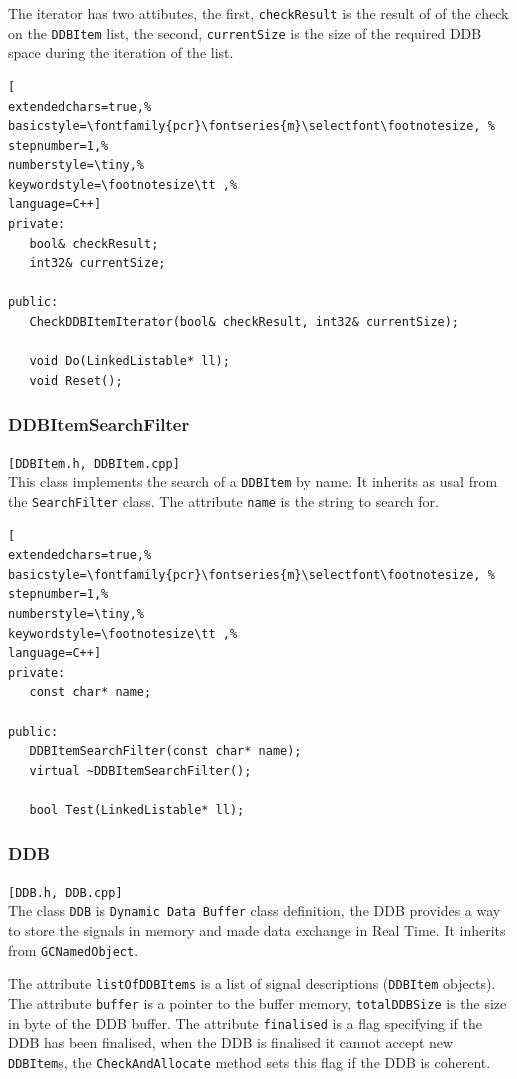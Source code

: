 The iterator has two attibutes, the first, \texttt{checkResult} is the result of of the check on the \texttt{DDBItem} list, the second, \texttt{currentSize} is the size of the required DDB space during the iteration of the list.

\begin{lstlisting}[
extendedchars=true,%
basicstyle=\fontfamily{pcr}\fontseries{m}\selectfont\footnotesize, %
stepnumber=1,%
numberstyle=\tiny,%
keywordstyle=\footnotesize\tt ,%
language=C++]
private:
   bool& checkResult;
   int32& currentSize;

public:
   CheckDDBItemIterator(bool& checkResult, int32& currentSize);

   void Do(LinkedListable* ll);
   void Reset();
\end{lstlisting}



\subsubsection{DDBItemSearchFilter}
\texttt{[DDBItem.h, DDBItem.cpp]}\\
This class implements the search of a \texttt{DDBItem} by name. It inherits as usal from the \texttt{SearchFilter} class. The attribute \texttt{name} is the string to search for.

\begin{lstlisting}[
extendedchars=true,%
basicstyle=\fontfamily{pcr}\fontseries{m}\selectfont\footnotesize, %
stepnumber=1,%
numberstyle=\tiny,%
keywordstyle=\footnotesize\tt ,%
language=C++]
private:
   const char* name;

public:
   DDBItemSearchFilter(const char* name);
   virtual ~DDBItemSearchFilter();

   bool Test(LinkedListable* ll);
\end{lstlisting}



\subsubsection{DDB}
\texttt{[DDB.h, DDB.cpp]}\\
The class \texttt{DDB} is \texttt{Dynamic Data Buffer} class definition, the DDB provides a way to store the signals in memory and made data exchange in Real Time. It inherits from \texttt{GCNamedObject}.

The attribute \texttt{listOfDDBItems} is a list of signal descriptions (\texttt{DDBItem} objects). The attribute \texttt{buffer} is a pointer to the buffer memory, \texttt{totalDDBSize} is the size in byte of the DDB buffer. The attribute \texttt{finalised} is a flag specifying if the DDB has been finalised, when the DDB is finalised it cannot accept new \texttt{DDBItem}s, the \texttt{CheckAndAllocate} method sets this flag if the DDB is coherent.

